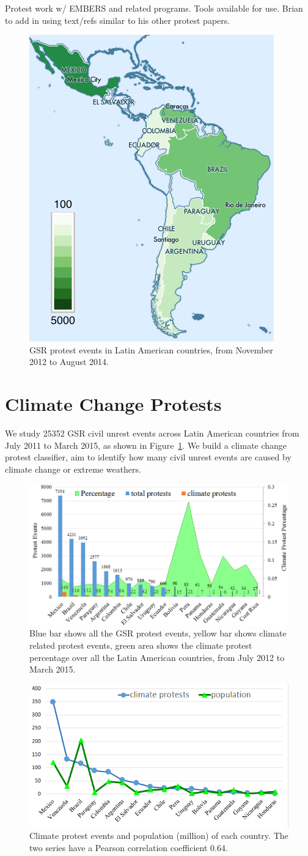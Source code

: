 \documentclass[9pt,twocolumn,twoside]{pnas-new}
\begin{document}
{\color{red} Protest work w/ EMBERS and related programs. Tools available for use. Brian to add in using text/refs similar to his other protest papers.}



\begin{figure}[ht]
\centerline
{\includegraphics[width=.2\textwidth]{figures/GSR}}
\caption{GSR protest events in Latin American countries, from November 2012 to August 2014.}
\label{GSR}
\end{figure}

\section*{Climate Change Protests}
We study 25352 GSR civil unrest events across Latin American countries from July 2011 to March 2015, as shown in Figure~\ref{GSR}. We build a climate change protest classifier, aim to identify how many civil unrest events are caused by climate change or extreme weathers.


\begin{figure}[ht]
\centerline
{\includegraphics[width=.45\textwidth]{figures/month-country-protest3}}
\caption{Blue bar shows all the GSR protest events, yellow bar shows climate related protest events, green area shows the climate protest percentage over all the Latin American countries, from July 2012 to March 2015.}
\label{month_percentage}
\end{figure}


\begin{figure}[ht]
\centerline
{\includegraphics[width=.4\textwidth]{figures/protest-population}}
\caption{Climate protest events and population (million) of each country. The two series have a Pearson correlation coefficient 0.64.}
\label{protest-population}
\end{figure}
\end{document}
